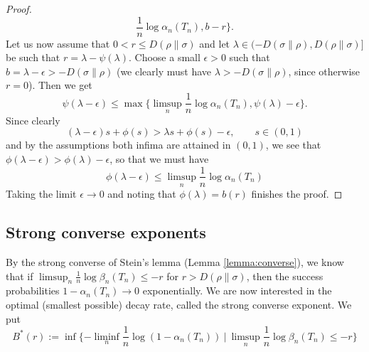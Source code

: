 \documentclass[12pt]{article}
\theoremstyle{definition}
\theoremstyle{remark}
\begin{document}
\begin{proof}
\[\frac1n \log \alpha_n(T_n), b-r\}.
\]
Let us now assume that $0< r\le D(\rho\|\sigma)$ and let $\lambda\in
(-D(\sigma\|\rho),D(\rho\|\sigma)]$ be such that $r=\lambda-\psi(\lambda)$. Choose a small
$\epsilon>0$ such that  $b=\lambda-\epsilon>-D(\sigma\|\rho)$ (we clearly must have
$\lambda>- D(\sigma\|\rho)$, since
otherwise $r=0$). Then we get
\[
\psi(\lambda-\epsilon)\le \max\{\limsup_n
\frac1n \log \alpha_n(T_n), \psi(\lambda)-\epsilon\}.
\]
Since clearly
\[
(\lambda-\epsilon)s+\phi(s)>\lambda s+\phi(s)-\epsilon,\qquad s\in (0,1)
\]
and by the assumptions both infima are attained in $(0,1)$, we see that
$\phi(\lambda-\epsilon)>\phi(\lambda)-\epsilon$, so that we must have
\[
\phi(\lambda-\epsilon)\le \limsup_n
\frac1n \log \alpha_n(T_n)
\]
Taking the limit $\epsilon\to 0$ and noting that $\phi(\lambda)=b(r)$ finishes the proof.


\end{proof}


\subsection{Strong converse exponents}

By the strong converse of Stein's lemma (Lemma \ref{lemma:converse}), we know that if
$\limsup_n\frac1n\log \beta_n(T_n)\le -r$ for $r>D(\rho\|\sigma)$, then the success
probabilities $1-\alpha_n(T_n)\to 0$ exponentially. We are now interested in the optimal
(smallest possible) decay rate, called the strong converse exponent. We put
\[
B^*(r):=\inf\{-\liminf_n\frac1n\log(1-\alpha_n(T_n))\ |\ \limsup_n
\frac1n\log\beta_n(T_n)\le -r\}
\]
\end{document}
